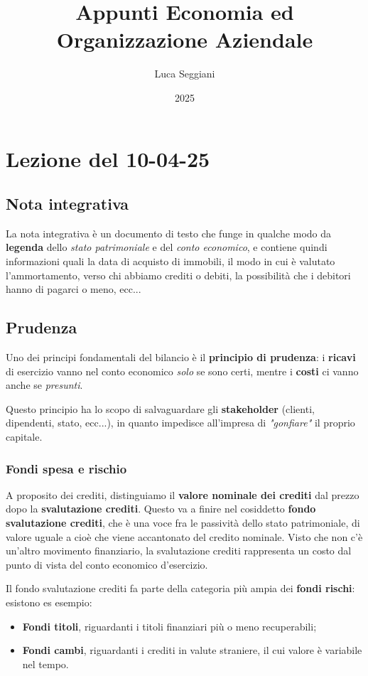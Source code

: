 \documentclass[a4paper,11pt]{article}
\title{Appunti Economia ed Organizzazione Aziendale}
\author{Luca Seggiani}
\date{2025}
\begin{document}
\section{Lezione del 10-04-25}

\thispagestyle{empty}
\pagestyle{fancy}

\subsection{Nota integrativa}
La nota integrativa è un documento di testo che funge in qualche modo da \textbf{legenda} dello \textit{stato patrimoniale} e del \textit{conto economico}, e contiene quindi informazioni quali la data di acquisto di immobili, il modo in cui è valutato l'ammortamento, verso chi abbiamo crediti o debiti, la possibilità che i debitori hanno di pagarci o meno, ecc... 

\subsection{Prudenza}
Uno dei principi fondamentali del bilancio è il \textbf{principio di prudenza}: i \textbf{ricavi} di esercizio vanno nel conto economico \textit{solo} se sono certi, mentre i \textbf{costi} ci vanno anche se \textit{presunti}.

Questo principio ha lo scopo di salvaguardare gli \textbf{stakeholder} (clienti, dipendenti, stato, ecc...), in quanto impedisce all'impresa di \textit{"gonfiare"} il proprio capitale. 

\subsubsection{Fondi spesa e rischio}
A proposito dei crediti, distinguiamo il \textbf{valore nominale dei crediti} dal prezzo dopo la \textbf{svalutazione crediti}.
Questo va a finire nel cosiddetto \textbf{fondo svalutazione crediti}, che è una voce fra le passività dello stato patrimoniale, di valore uguale a cioè che viene accantonato del credito nominale.
Visto che non c'è un'altro movimento finanziario, la svalutazione crediti rappresenta un costo dal punto di vista del conto economico d'esercizio.

Il fondo svalutazione crediti fa parte della categoria più ampia dei \textbf{fondi rischi}: esistono es esempio:
\begin{itemize}
	\item \textbf{Fondi titoli}, riguardanti i titoli finanziari più o meno recuperabili;
	\item \textbf{Fondi cambi}, riguardanti i crediti in valute straniere, il cui valore è variabile nel tempo.
\end{itemize}
\end{document}
